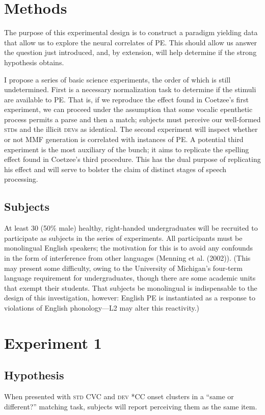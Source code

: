 \documentclass[jou,apacite]{apa6}
\begin{document}
\section{Methods}

The purpose of this experimental design is to construct a paradigm yielding data that allow us to explore the neural correlates of PE. This should allow us answer the question just introduced, and, by extension, will help determine if the strong hypothesis obtains. 

I propose a series of basic science experiments, the order of which is still undetermined. First is a necessary normalization task to determine if the stimuli are available to PE. That is, if we reproduce the effect found in Coetzee’s first experiment, we can proceed under the assumption that some vocalic epenthetic process permits a parse and then a match; subjects must perceive our well-formed \textsc{std}s and the illicit \textsc{dev}s as identical. The second experiment will inspect whether or not MMF generation is correlated with instances of PE. A potential third experiment is the most auxiliary of the bunch; it aims to replicate the spelling effect found in Coetzee’s third procedure. This has the dual purpose of replicating his effect and will serve to bolster the claim of distinct stages of speech processing.

    \subsection{Subjects}
    At least 30 (50\% male) healthy, right-handed undergraduates will be recruited to participate as subjects in the series of experiments. All participants must be monolingual English speakers; the motivation for this is to avoid any confounds in the form of interference from other languages (Menning et al. (2002)). (This may present some difficulty, owing to the University of Michigan’s four-term language requirement for undergraduates, though there are some academic units that exempt their students. That subjects be monolingual is indispensable to the design of this investigation, however: English PE is instantiated as a response to violations of English phonology—L2 may alter this reactivity.)
    
\section{Experiment 1}
    \subsection{Hypothesis}
    When presented with \textsc{std} CVC and \textsc{dev} *CC onset clusters in a “same or different?” matching task, subjects will report perceiving them as the same item.
    
\end{document}
